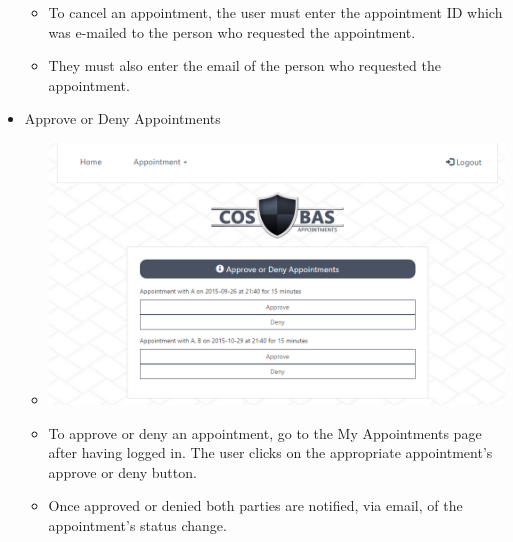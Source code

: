 \begin{itemize}
\begin{itemize}
				\item To cancel an appointment, the user must enter the appointment ID which was e-mailed to the person who requested the appointment.
				\item They must also enter the email of the person who requested the appointment.
			\end{itemize}
		\item Approve or Deny Appointments
			\begin{itemize}
				\item \includegraphics[width=\linewidth]{images/Screenshots/Approve_Deny.png}
				\item To approve or deny an appointment, go to the My Appointments page after having logged in. The user clicks on the appropriate appointment's approve or deny button.
				\item Once approved or denied both parties are notified, via email, of the appointment's status change.
			\end{itemize}
	\end{itemize}